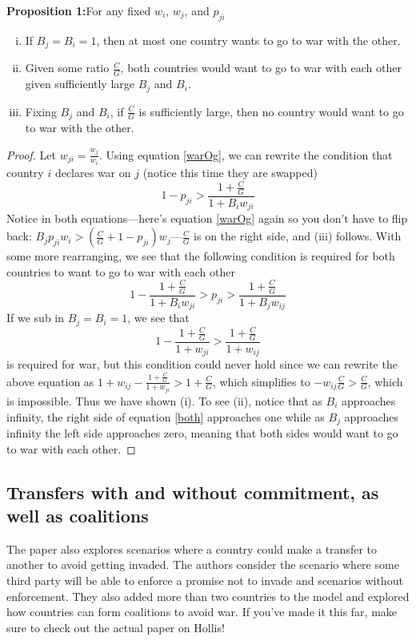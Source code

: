 \textbf{Proposition 1:}For any fixed $w_i$, $w_j$, and $p_{ji}$
\begin{enumerate}[(i)]
    \item If $B_j = B_i = 1$, then at most one country wants to go to war with the other. 
    \item Given some ratio $\frac{C}{G}$, both countries would want to go to war with each other given sufficiently large $B_j$ and $B_i$.
    \item Fixing $B_j$ and $B_i$, if $\frac{C}{G}$ is sufficiently large, then no country would want to go to war with the other.
\end{enumerate}
\begin{proof}
    Let $w_{ji} = \frac{w_j}{w_i}$. Using equation \ref{warOg}, we can rewrite the condition that country $i$ declares war on $j$ (notice this time they are swapped)
    \begin{equation}
        1 - p_{ji} > \frac{1 + \frac{C}{G}}{1 + B_i w_{ji}}
    \end{equation}
    Notice in both equations---here's equation \ref{warOg} again so you don't have to flip back: $B_{j} p_{ji}w_i> \left(\frac{C}{G} + 1-p_{ji}\right)w_j$---$\frac{C}{G}$ is on the right side, and (iii) follows. With some more rearranging, we see that the following condition is required for both countries to want to go to war with each other
    \begin{equation}\label{both}
        1- \frac{1 + \frac{C}{G}}{1 + B_i w_{ji}} > p_{ji} > \frac{1 + \frac{C}{G}}{1 + B_jw_{ij}}
    \end{equation}
    If we sub in $B_j = B_i = 1$, we see that 
    $$1- \frac{1 + \frac{C}{G}}{1 + w_{ji}} > \frac{1 + \frac{C}{G}}{1 + w_{ij}}$$
    is required for war, but this condition could never hold since we can rewrite the above equation as $1 + w_{ij} - \frac{1 + \frac{C}{G}}{1 + w_{ji}} > 1 + \frac{C}{G}$, which simplifies to $-w_{ij} \frac{C}{G} > \frac{C}{G}$, which is impossible. Thus we have shown (i). To see (ii), notice that as $B_i$ approaches infinity, the right side of equation \ref{both} approaches one while as $B_j$ approaches infinity the left side approaches zero, meaning that both sides would want to go to war with each other.
\end{proof}
\subsection*{Transfers with and without commitment, as well as coalitions}

The paper also explores scenarios where a country could make a transfer to another to avoid getting invaded. The authors consider the scenario where some third party will be able to enforce a promise not to invade and scenarios without enforcement. They also added more than two countries to the model and explored how countries can form coalitions to avoid war. If you've made it this far, make sure to check out the actual paper on Hollis! 

